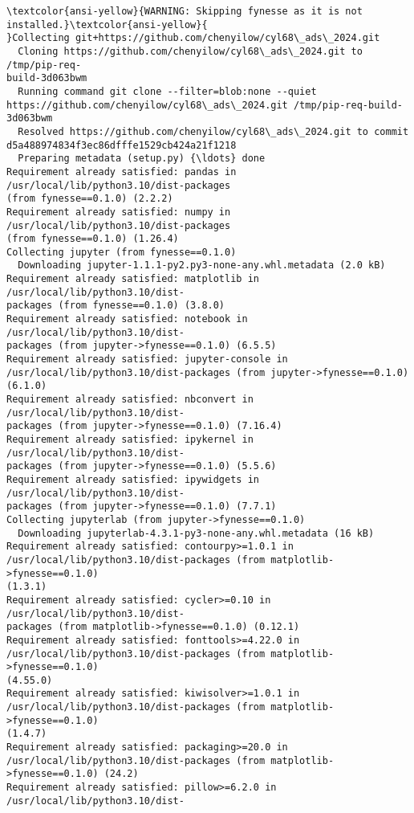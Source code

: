 \documentclass[11pt]{article}
\begin{document}
    \begin{Verbatim}[commandchars=\\\{\}]
\textcolor{ansi-yellow}{WARNING: Skipping fynesse as it is not installed.}\textcolor{ansi-yellow}{
}Collecting git+https://github.com/chenyilow/cyl68\_ads\_2024.git
  Cloning https://github.com/chenyilow/cyl68\_ads\_2024.git to /tmp/pip-req-
build-3d063bwm
  Running command git clone --filter=blob:none --quiet
https://github.com/chenyilow/cyl68\_ads\_2024.git /tmp/pip-req-build-3d063bwm
  Resolved https://github.com/chenyilow/cyl68\_ads\_2024.git to commit
d5a488974834f3ec86dfffe1529cb424a21f1218
  Preparing metadata (setup.py) {\ldots} done
Requirement already satisfied: pandas in /usr/local/lib/python3.10/dist-packages
(from fynesse==0.1.0) (2.2.2)
Requirement already satisfied: numpy in /usr/local/lib/python3.10/dist-packages
(from fynesse==0.1.0) (1.26.4)
Collecting jupyter (from fynesse==0.1.0)
  Downloading jupyter-1.1.1-py2.py3-none-any.whl.metadata (2.0 kB)
Requirement already satisfied: matplotlib in /usr/local/lib/python3.10/dist-
packages (from fynesse==0.1.0) (3.8.0)
Requirement already satisfied: notebook in /usr/local/lib/python3.10/dist-
packages (from jupyter->fynesse==0.1.0) (6.5.5)
Requirement already satisfied: jupyter-console in
/usr/local/lib/python3.10/dist-packages (from jupyter->fynesse==0.1.0) (6.1.0)
Requirement already satisfied: nbconvert in /usr/local/lib/python3.10/dist-
packages (from jupyter->fynesse==0.1.0) (7.16.4)
Requirement already satisfied: ipykernel in /usr/local/lib/python3.10/dist-
packages (from jupyter->fynesse==0.1.0) (5.5.6)
Requirement already satisfied: ipywidgets in /usr/local/lib/python3.10/dist-
packages (from jupyter->fynesse==0.1.0) (7.7.1)
Collecting jupyterlab (from jupyter->fynesse==0.1.0)
  Downloading jupyterlab-4.3.1-py3-none-any.whl.metadata (16 kB)
Requirement already satisfied: contourpy>=1.0.1 in
/usr/local/lib/python3.10/dist-packages (from matplotlib->fynesse==0.1.0)
(1.3.1)
Requirement already satisfied: cycler>=0.10 in /usr/local/lib/python3.10/dist-
packages (from matplotlib->fynesse==0.1.0) (0.12.1)
Requirement already satisfied: fonttools>=4.22.0 in
/usr/local/lib/python3.10/dist-packages (from matplotlib->fynesse==0.1.0)
(4.55.0)
Requirement already satisfied: kiwisolver>=1.0.1 in
/usr/local/lib/python3.10/dist-packages (from matplotlib->fynesse==0.1.0)
(1.4.7)
Requirement already satisfied: packaging>=20.0 in
/usr/local/lib/python3.10/dist-packages (from matplotlib->fynesse==0.1.0) (24.2)
Requirement already satisfied: pillow>=6.2.0 in /usr/local/lib/python3.10/dist-

\end{Verbatim}
\end{document}

